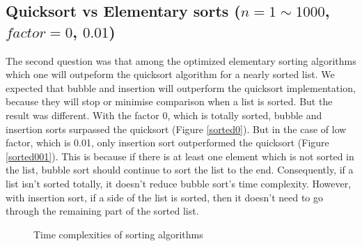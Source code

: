 \documentclass[12pt]{article}
\begin{document}
\newpage
\subsection{Quicksort vs Elementary sorts ($n=1 \sim 1000$, $factor=0$, $0.01$)}
The second question was that among the optimized elementary sorting algorithms which one will
outpeform the quicksort algorithm for a nearly sorted list. We expected that bubble and insertion will 
outperform the quicksort implementation, because they will stop or minimise comparison when
a list is sorted. But the result was different. With the factor 0, which is totally sorted,
bubble and insertion sorts surpassed the quicksort (Figure \ref{sorted0}). But in the case of low factor,
which is 0.01, only insertion sort outperformed the quicksort (Figure \ref{sorted001}). This is because 
if there is at least one element which is not sorted in the list, bubble sort should continue
to sort the list to the end. Consequently, if a list isn't sorted totally, it doesn't
 reduce bubble sort's time complexity. However, with insertion sort, if a side of
 the list is sorted, then it doesn't need to go through the remaining part of the sorted list.    

\begin{figure}[hbt!]
  \centering
  \hfill
  \caption{Time complexities of sorting algorithms}
\end{figure}
\end{document}
